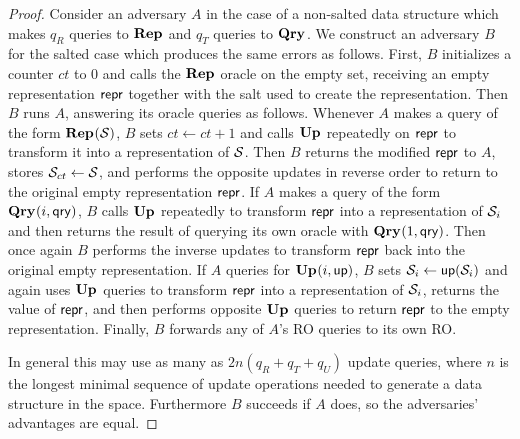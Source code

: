 \begin{proof}
%
Consider an adversary $A$ in the case of a non-salted data structure which makes
$q_R$ queries to $\textup{\textbf{Rep}}\hspace{0.5pt}$ and $q_T$ queries to $\textup{\textbf{Qry}}\hspace{0.5pt}$. We construct an adversary
$B$ for the salted case which produces the same errors as follows. First, $B$
initializes a counter $ct$ to 0 and calls the $\textup{\textbf{Rep}}\hspace{0.5pt}$ oracle on the empty set,
receiving an empty representation $\mathsf{repr}$ together with the salt used to create
the representation. Then $B$ runs $A$, answering its oracle queries as follows.
Whenever $A$ makes a query of the form $\textup{\textbf{Rep}}\hspace{0.5pt}(\mathcal{S})$, $B$ sets $ct \gets ct + 1$
and calls $\textup{\textbf{Up}}\hspace{0.5pt}$ repeatedly on $\mathsf{repr}$ to transform it into a representation of
$\mathcal{S}$. Then $B$ returns the modified $\mathsf{repr}$ to $A$, stores $\mathcal{S}_{ct} \gets
\mathcal{S}$, and performs the opposite updates in reverse order to return to the
original empty representation $\mathsf{repr}$. If $A$ makes a query of the form
$\textup{\textbf{Qry}}\hspace{0.5pt}(i,\mathsf{qry})$, $B$ calls $\textup{\textbf{Up}}\hspace{0.5pt}$ repeatedly to transform $\mathsf{repr}$ into a
representation of $\mathcal{S}_i$ and then returns the result of querying its own
oracle with $\textup{\textbf{Qry}}\hspace{0.5pt}(1, \mathsf{qry})$. Then once again $B$ performs the inverse updates
to transform $\mathsf{repr}$ back into the original empty representation. If $A$ queries
for $\textup{\textbf{Up}}\hspace{0.5pt}(i, \mathsf{up})$, $B$ sets $\mathcal{S}_i \gets \mathsf{up}(\mathcal{S}_i)$ and again uses $\textup{\textbf{Up}}\hspace{0.5pt}$
queries to transform $\mathsf{repr}$ into a representation of $\mathcal{S}_i$, returns the value
of $\mathsf{repr}$, and then performs opposite $\textup{\textbf{Up}}\hspace{0.5pt}$ queries to return $\mathsf{repr}$ to the
empty representation. Finally, $B$ forwards any of $A$'s RO queries to its own
RO.

In general this may use as many as $2n(q_R+q_T+q_U)$ update queries, where $n$
is the longest minimal sequence of update operations needed to generate a data
structure in the space. Furthermore $B$ succeeds if $A$ does, so the
adversaries' advantages are equal.
%
\missingqed
\end{proof}



